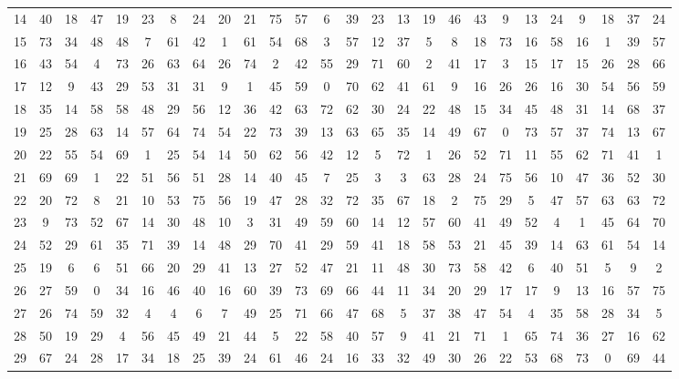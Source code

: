 \begin{table}
\begin{tabular}{c c c c c c c c c c c c c c c c c c c c c c c c c c }
14 & 40 & 18 & 47 & 19 & 23 & 8 & 24 & 20 & 21 & 75 & 57 & 6 & 39 & 23 & 13 & 19 & 46 & 43 & 9 & 13 & 24 & 9 & 18 & 37 & 24 \\
15 & 73 & 34 & 48 & 48 & 7 & 61 & 42 & 1 & 61 & 54 & 68 & 3 & 57 & 12 & 37 & 5 & 8 & 18 & 73 & 16 & 58 & 16 & 1 & 39 & 57 \\
16 & 43 & 54 & 4 & 73 & 26 & 63 & 64 & 26 & 74 & 2 & 42 & 55 & 29 & 71 & 60 & 2 & 41 & 17 & 3 & 15 & 17 & 15 & 26 & 28 & 66 \\
17 & 12 & 9 & 43 & 29 & 53 & 31 & 31 & 9 & 1 & 45 & 59 & 0 & 70 & 62 & 41 & 61 & 9 & 16 & 26 & 26 & 16 & 30 & 54 & 56 & 59 \\
18 & 35 & 14 & 58 & 58 & 48 & 29 & 56 & 12 & 36 & 42 & 63 & 72 & 62 & 30 & 24 & 22 & 48 & 15 & 34 & 45 & 48 & 31 & 14 & 68 & 37 \\
19 & 25 & 28 & 63 & 14 & 57 & 64 & 74 & 54 & 22 & 73 & 39 & 13 & 63 & 65 & 35 & 14 & 49 & 67 & 0 & 73 & 57 & 37 & 74 & 13 & 67 \\
20 & 22 & 55 & 54 & 69 & 1 & 25 & 54 & 14 & 50 & 62 & 56 & 42 & 12 & 5 & 72 & 1 & 26 & 52 & 71 & 11 & 55 & 62 & 71 & 41 & 1 \\
21 & 69 & 69 & 1 & 22 & 51 & 56 & 51 & 28 & 14 & 40 & 45 & 7 & 25 & 3 & 3 & 63 & 28 & 24 & 75 & 56 & 10 & 47 & 36 & 52 & 30 \\
22 & 20 & 72 & 8 & 21 & 10 & 53 & 75 & 56 & 19 & 47 & 28 & 32 & 72 & 35 & 67 & 18 & 2 & 75 & 29 & 5 & 47 & 57 & 63 & 63 & 72 \\
23 & 9 & 73 & 52 & 67 & 14 & 30 & 48 & 10 & 3 & 31 & 49 & 59 & 60 & 14 & 12 & 57 & 60 & 41 & 49 & 52 & 4 & 1 & 45 & 64 & 70 \\
24 & 52 & 29 & 61 & 35 & 71 & 39 & 14 & 48 & 29 & 70 & 41 & 29 & 59 & 41 & 18 & 58 & 53 & 21 & 45 & 39 & 14 & 63 & 61 & 54 & 14 \\
25 & 19 & 6 & 6 & 51 & 66 & 20 & 29 & 41 & 13 & 27 & 52 & 47 & 21 & 11 & 48 & 30 & 73 & 58 & 42 & 6 & 40 & 51 & 5 & 9 & 2 \\
26 & 27 & 59 & 0 & 34 & 16 & 46 & 40 & 16 & 60 & 39 & 73 & 69 & 66 & 44 & 11 & 34 & 20 & 29 & 17 & 17 & 9 & 13 & 16 & 57 & 75 \\
27 & 26 & 74 & 59 & 32 & 4 & 4 & 6 & 7 & 49 & 25 & 71 & 66 & 47 & 68 & 5 & 37 & 38 & 47 & 54 & 4 & 35 & 58 & 28 & 34 & 5 \\
28 & 50 & 19 & 29 & 4 & 56 & 45 & 49 & 21 & 44 & 5 & 22 & 58 & 40 & 57 & 9 & 41 & 21 & 71 & 1 & 65 & 74 & 36 & 27 & 16 & 62 \\
29 & 67 & 24 & 28 & 17 & 34 & 18 & 25 & 39 & 24 & 61 & 46 & 24 & 16 & 33 & 32 & 49 & 30 & 26 & 22 & 53 & 68 & 73 & 0 & 69 & 44 \\

\end{tabular}
\end{table}
